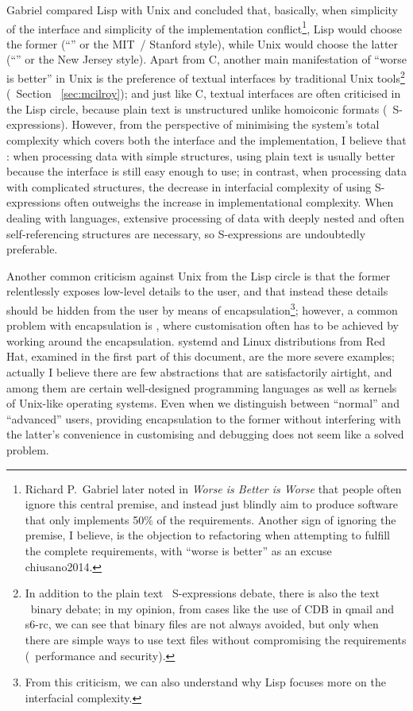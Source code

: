 Gabriel compared Lisp with Unix and concluded that, basically, when simplicity
of the interface and simplicity of the implementation conflict\footnote{Richard
P.\ Gabriel later noted in \emph{Worse is Better is Worse} that people often
ignore this central premise, and instead just blindly aim to produce software
that only implements 50\% of the requirements.  Another sign of ignoring the
premise, I believe, is the objection to refactoring when attempting to fulfill
the complete requirements, with ``worse is better'' as an excuse\cupercite%
{chiusano2014}.}, Lisp would choose the former (``'' or
the MIT~/ Stanford style), while Unix would choose the latter (``'' or the New Jersey style).  Apart from C, another main manifestation
of ``worse is better'' in Unix is the preference of textual interfaces by
traditional Unix tools\footnote{In addition to the plain text \vs~S-expressions
debate, there is also the text \vs~binary debate; in my opinion, from cases
like the use of CDB in qmail and s6-rc, we can see that binary files are not
always avoided, but only when there are simple ways to use text files without
compromising the requirements (\eg~performance and security).} (\cf~Section~%
\ref{sec:mcilroy}); and just like C, textual interfaces are often criticised in
the Lisp circle, because plain text is unstructured unlike homoiconic formats
(\eg~S-expressions).  However, from the perspective of minimising the system's
total complexity which covers both the interface and the implementation, I
believe that : when processing data with simple structures, using
plain text is usually better because the interface is still easy enough to use;
in contrast, when processing data with complicated structures, the decrease in
interfacial complexity of using S-expressions often outweighs the increase
in implementational complexity.  When dealing with languages, extensive
processing of data with deeply nested and often self-referencing
structures are necessary, so S-expressions are undoubtedly preferable.

Another common criticism against Unix from the Lisp circle is that the former
relentlessly exposes low-level details to the user, and that instead these
details should be hidden from the user by means of encapsulation\footnote{From
this criticism, we can also understand why Lisp focuses more on the interfacial
complexity.}; however, a common problem with encapsulation is , where customisation often has to be achieved by working around
the encapsulation.  systemd and Linux distributions from Red Hat, examined
in the first part of this document, are the more severe examples; actually
I believe there are few abstractions that are satisfactorily airtight,
and among them are certain well-designed programming languages as well
as kernels of Unix-like operating systems.  Even when we distinguish
between ``normal'' and ``advanced'' users, providing encapsulation
to the former without interfering with the latter's convenience
in customising and debugging does not seem like a solved problem.

